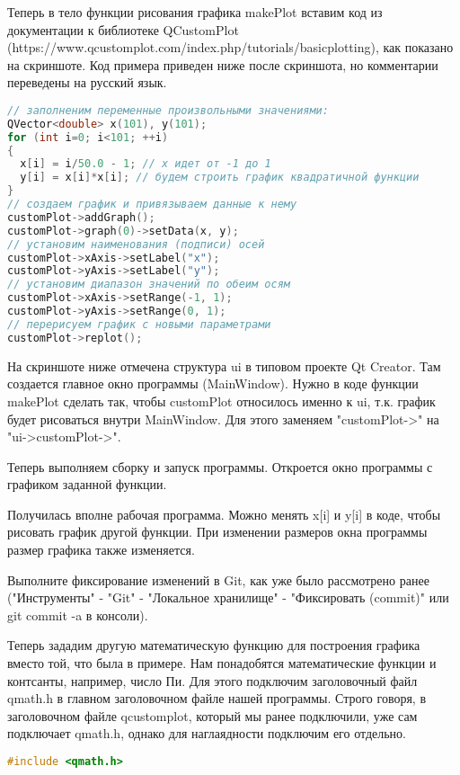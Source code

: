 Теперь в тело функции рисования графика makePlot вставим код из документации к библиотеке QCustomPlot (https://www.qcustomplot.com/index.php/tutorials/basicplotting), как показано на скриншоте. Код примера приведен ниже после скриншота, но комментарии переведены на русский язык.

\begin{lstlisting}[language=c++]
// заполненим переменные произвольными значениями:
QVector<double> x(101), y(101);
for (int i=0; i<101; ++i)
{
  x[i] = i/50.0 - 1; // x идет от -1 до 1
  y[i] = x[i]*x[i]; // будем строить график квадратичной функции
}
// создаем график и привязываем данные к нему
customPlot->addGraph();
customPlot->graph(0)->setData(x, y);
// установим наименования (подписи) осей
customPlot->xAxis->setLabel("x");
customPlot->yAxis->setLabel("y");
// установим диапазон значений по обеим осям
customPlot->xAxis->setRange(-1, 1);
customPlot->yAxis->setRange(0, 1);
// перерисуем график с новыми параметрами
customPlot->replot();
\end{lstlisting}

На скриншоте ниже отмечена структура ui в типовом проекте Qt Creator. Там создается главное окно программы (MainWindow). Нужно в коде функции makePlot сделать так, чтобы customPlot относилось именно к ui, т.к. график будет рисоваться внутри MainWindow. Для этого заменяем "customPlot->" на "ui->customPlot->".

Теперь выполняем сборку и запуск программы. Откроется окно программы с графиком заданной функции.

Получилась вполне рабочая программа. Можно менять x[i] и y[i] в коде, чтобы рисовать график другой функции. При изменении размеров окна программы размер графика также изменяется.

Выполните фиксирование изменений в Git, как уже было рассмотрено ранее ("Инструменты" - "Git" - "Локальное хранилище" - "Фиксировать (commit)" или git commit -a в консоли).

Теперь зададим другую математическую функцию для построения графика вместо той, что была в примере. Нам понадобятся математические функции и контсанты, например, число Пи. Для этого подключим заголовочный файл qmath.h в главном заголовочном файле нашей программы. Строго говоря, в заголовочном файле qcustomplot, который мы ранее подключили, уже сам подключает qmath.h, однако для наглаядности подключим его отдельно.
\begin{lstlisting}[language=c++]
#include <qmath.h>
\end{lstlisting}

